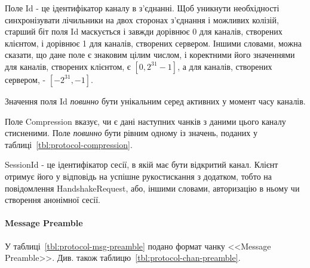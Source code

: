 Поле Id - це ідентифікатор каналу в з'єднанні. Щоб уникнути необхідності
синхронізувати лічильники на двох сторонах з'єднання і можливих колізій,
старший біт поля Id маскується і завжди дорівнює 0 для каналів, створених
клієнтом, і дорівнює 1 для каналів, створених сервером. Іншими словами, можна
сказати, що дане поле є знаковим цілим числом, і коректними його значеннями для
каналів, створених клієнтом, є $[0, 2^{31} - 1]$, а для каналів, створених
сервером, - $[{-2^{31}}, -1]$.

Значення поля Id \emph{повинно} бути унікальним серед активних у момент часу
каналів.

Поле Compression вказує, чи є дані наступних чанків з даними цього каналу
стисненими. Поле \emph{повинно} бути рівним одному із значень, поданих у
таблиці~\ref{tbl:protocol-compression}.

\begin{table}[htbp]
\end{table}

SessionId - це ідентифікатор сесії, в якій має бути відкритий канал.  Клієнт
отримує його у відповідь на успішне рукостискання з додатком, тобто на
повідомлення HandshakeRequest, або, іншими словами, авторизацію в ньому чи
створення анонімної сесії.

\paragraph{Message Preamble}

У таблиці~\ref{tbl:protocol-msg-preamble} подано формат чанку <<Message Preamble>>.
Див. також таблицю~\ref{tbl:protocol-chan-preamble}.

\begin{table}[htbp]
\end{table}

